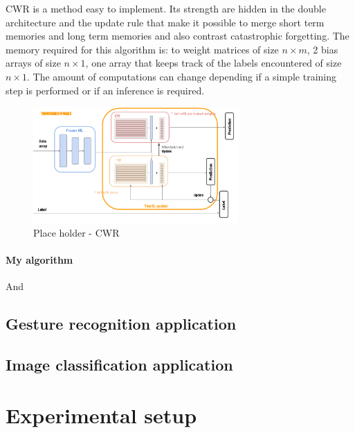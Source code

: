\documentclass[12pt]{report}
\begin{document}
CWR is a method easy to implement. Its strength are hidden in the double architecture and the update rule that make it possible to merge short term memories and long term memories and also contrast catastrophic forgetting. The memory required for this algorithm is: to weight matrices of size $n \times m$, 2 bias arrays of size $n \times 1$, one array that keeps track of the labels encountered of size $n \times 1$. The amount of computations can change depending if a simple training step is performed or if an inference is required.

\begin{figure}[h!]
    \centering
    \includegraphics[width=0.7\textwidth]{Figures/Chapter3/CWR.png} 
    \caption{Place holder - CWR}
    \label{fig:block_diag_CWR}    
\end{figure}

\subsubsection{My algorithm}





And


\section{Gesture recognition application}

\section{Image classification application}





\chapter{Experimental setup}
\end{document}
